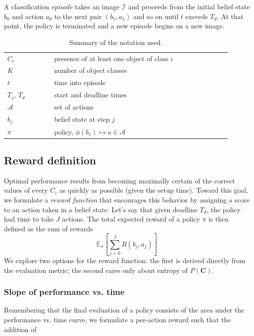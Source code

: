\documentclass[runningheads]{llncs}
\begin{document}
A classification \emph{episode} takes an image $\mathcal{I}$ and proceeds from the initial belief state $b_0$ and action $a_0$ to the next pair $(b_1,a_1)$ and so on until $t$ exceeds $T_d$.
At that point, the policy is terminated and a new episode begins on a new image.

\begin{table}
\centering
\caption{Summary of the notation used.}
\label{tab:notation}
\begin{tabular}{|l|l|}
	\hline
	$C_i$         & presence of at least one object of class $i$  \\ 
	$K$           & number of object classes                      \\ 
	$t$           & time into episode                             \\ 
	$T_s$, $T_d$  & start and deadline times                      \\ 
	$\mathcal{A}$ & set of actions                                \\ 
	$b_j$        	& belief state at step $j$                                 \\ 
	$\pi$         & policy, $\phi(b_s) \mapsto a \in \mathcal{A}$ \\ 
	\hline
\end{tabular}\end{table}

\subsection{Reward definition}
Optimal performance results from becoming maximally certain of the correct values of every $C_i$ as quickly as possible (given the setup time).
Toward this goal, we formulate a \emph{reward function} that encourages this behavior by assigning a score to an action taken in a belief state.
Let's say that given deadline $T_d$, the policy had time to take $J$ actions.
The total expected reward of a policy $\pi$ is then defined as the sum of rewards
\begin{equation}
\mathbb{E}_\pi[\sum_{j=0}^J R(b_j, a_j)]
\end{equation}
We explore two options for the reward function: the first is derived directly from the evaluation metric; the second cares only about entropy of $P(\mathbf{C})$.

\subsubsection{Slope of performance vs. time}
Remembering that the final evaluation of a policy consists of the area under the performance vs. time curve, we formulate a per-action reward such that the addition of 
\end{document}
